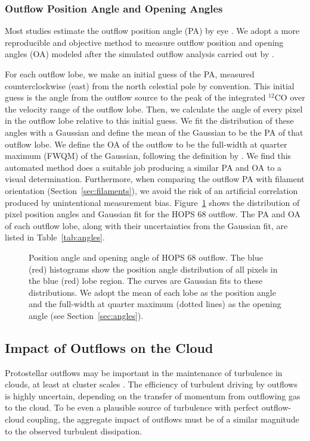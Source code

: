 \documentclass[twocolumn]{aastex63}
\newcommand{\example}{HOPS 68}
\newcommand{\co}[1][]{\ensuremath{^{#1}}CO}
\begin{document}
\subsubsection{Outflow Position Angle and Opening Angles\label{sec:angles}}
Most studies estimate the outflow position angle (PA) by eye \citep[e.g.][]{Morgan91,Takahashi08,Plunkett13,Stephens17,Kong19,Tanabe19}. We adopt a more reproducible and objective method to measure outflow position and opening angles (OA) modeled after the simulated outflow analysis carried out by \citet{Offner11}.

For each outflow lobe, we make an initial guess of the PA, measured counterclockwise (east) from the north celestial pole by convention. This initial guess is the angle from the outflow source to the peak of the integrated \co[12]{} over the velocity range of the outflow lobe. Then, we calculate the angle of every pixel in the outflow lobe relative to this initial guess. We fit the distribution of these angles with a Gaussian and define the mean of the Gaussian to be the PA of that outflow lobe. We define the OA of the outflow to be the full-width at quarter maximum (FWQM) of the Gaussian, following the definition by \cite{Offner11}. We find this automated method does a suitable job producing a similar PA and OA to a visual determination. Furthermore, when comparing the outflow PA with filament orientation (Section~\ref{sec:filaments}), we avoid the risk of an artificial correlation produced by unintentional measurement bias. Figure~\ref{fig:angles} shows the distribution of pixel position angles and Gaussian fit for the \example{} outflow. The PA and OA of each outflow lobe, along with their uncertainties from the Gaussian fit, are listed in Table~\ref{tab:angles}.

\begin{figure}
\caption{Position angle and opening angle of \example{} outflow. The blue (red) histograms show the position angle distribution of all pixels in the blue (red) lobe region. The curves are Gaussian fits to these distributions. We adopt the mean of each lobe as the position angle and the full-width at quarter maximum (dotted lines) as the opening angle (see Section~\ref{sec:angles}).\label{fig:angles}}
\end{figure}


\subsection{Impact of Outflows on the Cloud}\label{sec:impact}
Protostellar outflows may be important in the maintenance of turbulence in clouds, at least at cluster scales \citep{Nakamura07}. The efficiency of turbulent driving by outflows is highly uncertain, depending on the transfer of momentum from outflowing gas to the cloud. To be even a plausible source of turbulence with perfect outflow-cloud coupling, the aggregate impact of outflows must be of a similar magnitude to the observed turbulent dissipation.
\end{document}
